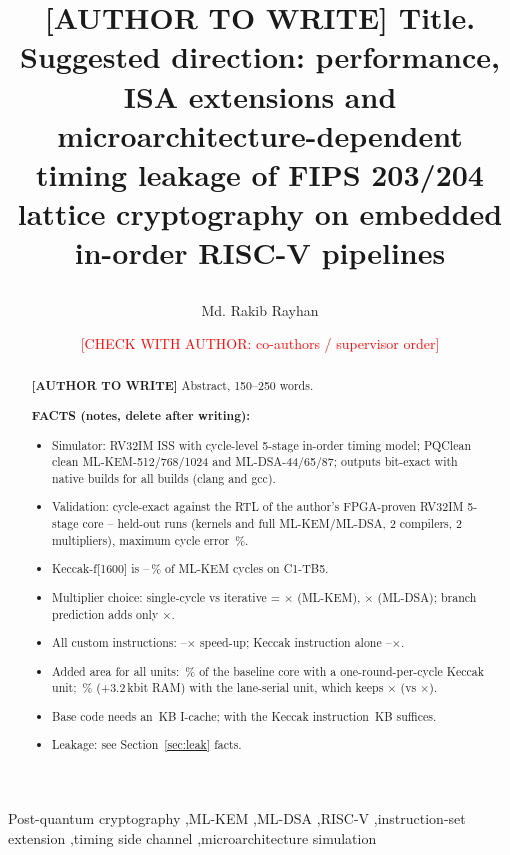 \documentclass[preprint,12pt,authoryear]{elsarticle}
\newcommand{\AW}[1]{\par\noindent\colorbox{yellow!40}{\parbox{\linewidth}{\textbf{[AUTHOR TO WRITE]} #1}}\par}
\newcommand{\CK}[1]{\textcolor{red}{[CHECK WITH AUTHOR: #1]}}
\newenvironment{facts}{\par\small\noindent\textbf{FACTS (notes, delete after writing):}\begin{itemize}\setlength\itemsep{0pt}}{\end{itemize}\normalsize}
\begin{document}
\begin{frontmatter}
\title{\AW{Title. Suggested direction: performance, ISA extensions and microarchitecture-dependent timing leakage of FIPS 203/204 lattice cryptography on embedded in-order RISC-V pipelines}}
\author[nsu]{Md. Rakib Rayhan}
\ead{\CK{email}}
\author[nsu]{\CK{co-authors / supervisor order}}

\begin{abstract}
\AW{Abstract, 150--250 words.}
\begin{facts}
\item Simulator: RV32IM ISS with cycle-level 5-stage in-order timing model; PQClean clean ML-KEM-512/768/1024 and ML-DSA-44/65/87; outputs bit-exact with native builds for all \FactNumBuilds{} builds (clang and gcc).
\item Validation: cycle-exact against the RTL of the author's FPGA-proven RV32IM 5-stage core -- \FactValRuns{} held-out runs (kernels and full ML-KEM/ML-DSA, 2 compilers, 2 multipliers), maximum cycle error \FactValMaxErr\,\%.
\item Keccak-f[1600] is \FactKeccakShareKemMin--\FactKeccakShareKemMax\,\% of ML-KEM cycles on C1-TB5.
\item Multiplier choice: single-cycle vs iterative = \FactMulGainKem$\times$ (ML-KEM), \FactMulGainDsa$\times$ (ML-DSA); branch prediction adds only \FactBpGainKem$\times$.
\item All custom instructions: \FactAllSpeedMin--\FactAllSpeedMax$\times$ speed-up; Keccak instruction alone \FactKSpeedMin--\FactKSpeedMax$\times$.
\item Added area for all units: \FactAllAreaPct\,\% of the baseline core with a one-round-per-cycle Keccak unit; \FactAllLsAreaPct\,\% (+3.2\,kbit RAM) with the lane-serial unit, which keeps \FactAllLsSpeed$\times$ (vs \FactAllSpeedGm$\times$).
\item Base code needs an \FactIcNeedBase\,KB I-cache; with the Keccak instruction \FactIcNeedAll\,KB suffices.
\item Leakage: see Section~\ref{sec:leak} facts.
\end{facts}
\end{abstract}
\begin{keyword}
Post-quantum cryptography \sep ML-KEM \sep ML-DSA \sep RISC-V \sep instruction-set extension \sep timing side channel \sep microarchitecture simulation
\end{keyword}
\end{frontmatter}
\end{document}
